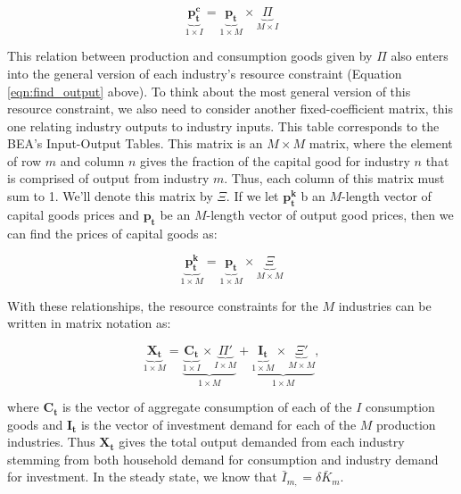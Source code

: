 \documentclass[letterpaper,12pt]{article}
\theoremstyle{definition}
\begin{document}
\begin{spacing}{1.5}
\begin{equation}
\label{eqn:capital_prices}
\underbrace{\boldsymbol{p^{c}_{t}}}_{1\times I} =\underbrace{\boldsymbol{p_{t}}}_{1\times M} \times  \underbrace{\Pi}_{M\times I}
\end{equation}

This relation between production and consumption goods given by $\Pi$ also enters into the general version of each industry's resource constraint (Equation \ref{eqn:find_output} above).   To think about the most general version of this resource constraint, we also need to consider another fixed-coefficient matrix, this one relating industry outputs to industry inputs.  This table corresponds to the BEA's Input-Output Tables.  This matrix is an $M\times M$ matrix, where the element of row $m$ and column $n$ gives the fraction of the capital good for industry $n$ that is comprised of output from industry $m$.  Thus, each column of this matrix must sum to 1.   We'll denote this matrix by $\Xi$.  If we let $\boldsymbol{p^{k}_{t}}$ b an $M$-length vector of capital goods prices and $\boldsymbol{p_{t}}$ be an $M$-length vector of output good prices, then we can find the prices of capital goods as:

\begin{equation}
\label{eqn:capital_prices}
\underbrace{\boldsymbol{p^{k}_{t}}}_{1\times M} =\underbrace{\boldsymbol{p_{t}}}_{1\times M} \times  \underbrace{\Xi}_{M\times M}
\end{equation}

With these relationships, the resource constraints for the $M$ industries can be written in matrix notation as:

\begin{equation}
\label{eqn:matrix_rc}
\underbrace{\boldsymbol{X_{t}}}_{1\times M} = \underbrace{\underbrace{\boldsymbol{C_{t}}}_{1\times I} \times  \underbrace{\Pi'}_{I\times M}}_{1\times M} + \underbrace{\underbrace{\boldsymbol{I_{t}}}_{1\times M} \times  \underbrace{\Xi'}_{M\times M}}_{1\times M}, 
\end{equation}

\noindent\noindent where $\boldsymbol{C_{t}}$ is the vector of aggregate consumption of each of the $I$ consumption goods and $\boldsymbol{I_{t}}$ is the vector of investment demand for each of the $M$ production industries.  Thus $\boldsymbol{X_{t}}$ gives the total output demanded from each industry stemming from both household demand for consumption and industry demand for investment.  In the steady state, we know that $\bar{I}_{m,}=\delta \bar{K}_{m}$.  


\end{spacing}
\end{document}
